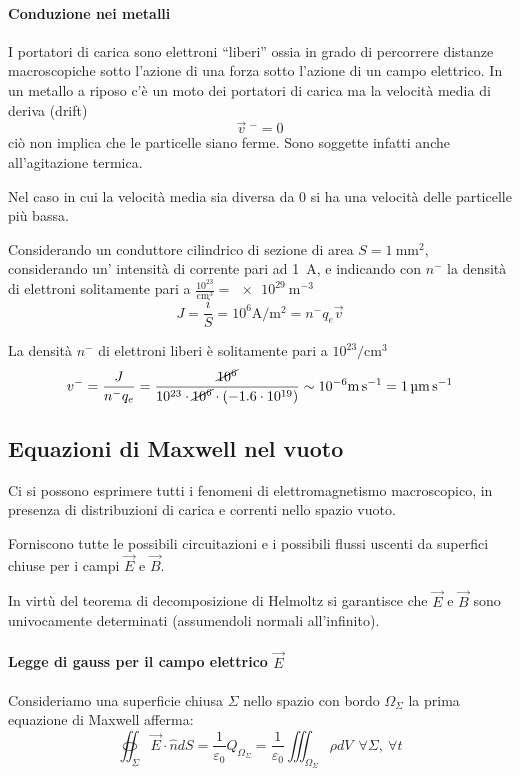 \paragraph{Conduzione nei metalli}
I portatori di carica sono elettroni ``liberi'' ossia in grado di percorrere distanze
macroscopiche sotto l'azione di una forza sotto l'azione di un campo elettrico.
In un metallo a riposo c'è un moto dei portatori di carica ma la velocità media di deriva (drift)
$$
\vec{v}\ ^- = 0
$$
ciò non implica che le particelle siano ferme. Sono soggette infatti anche all'agitazione termica.

Nel caso in cui la velocità media sia diversa da 0 si ha una velocità delle particelle più bassa.

Considerando un conduttore cilindrico di sezione di area $S=\SI{1}{\milli\meter^2}$, considerando un'
intensità di corrente pari ad \SI{1}{\ampere}, e indicando con $n^-$ la densità di elettroni
solitamente pari a $\frac{10^{23}}{\si{\centi\meter}^3} = \SI{e29}{\meter^{-3}}$
$$
J = \frac{i}{S} = 10^6\si{\ampere\per\meter^2} = n^-q_e\vec{v}
$$

La densità $n^-$ di elettroni liberi è solitamente pari a $10^{23}/\si{\centi\meter^3}$
$$
v^- = \frac{J}{n^-q_e} =  \frac{\cancel{10^6}}{10^{23}\cdot\cancel{10^6}\cdot (-1.6\cdot10^{19})} \sim 10^{-6} \si{\meter\per\second} = \SI{1}{\micro\meter\per\second}
$$

\subsection{Equazioni di Maxwell nel vuoto}
Ci si possono esprimere tutti i fenomeni di elettromagnetismo macroscopico, in presenza di distribuzioni 
di carica e correnti nello spazio vuoto.

Forniscono tutte le possibili circuitazioni e i possibili flussi uscenti da superfici chiuse per i campi
$\vec{E}$ e $\vec{B}$.

In virtù del teorema di decomposizione di Helmoltz si garantisce che $\vec{E}$ e $\vec{B}$ 
sono univocamente determinati (assumendoli normali all'infinito).

\paragraph{Legge di gauss per il campo elettrico $\vec{E}$}
Consideriamo una superficie chiusa $\Sigma$ nello spazio con bordo $\Omega_\Sigma$
la prima equazione di Maxwell afferma: 
\begin{equation}
\label{eq:legge_gauss}
\oiint_\Sigma \vec{E}\cdot\hat{n}dS = \frac{1}{\varepsilon_0}Q_{\Omega_\Sigma} = \frac{1}{\varepsilon_0}
\iiint_{\Omega_\Sigma} \rho dV \ \ \forall \Sigma,\ \forall t
\end{equation}

